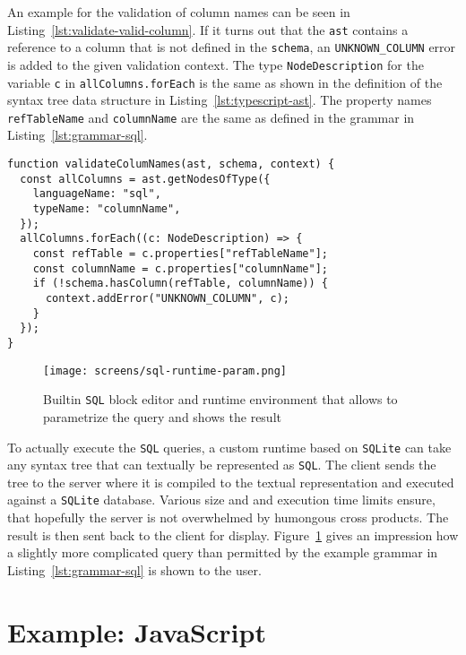 \documentclass[sigconf,natbib=false]{acmart}
\begin{document}
An example for the validation of column names can be seen in Listing~\ref{lst:validate-valid-column}. If it turns out that the \texttt{ast} contains a reference to a column that is not defined in the \texttt{schema}, an \texttt{UNKNOWN\_COLUMN} error is added to the given validation context. The type \texttt{NodeDescription} for the variable \texttt{c} in \texttt{allColumns.forEach} is the same as shown in the definition of the syntax tree data structure in Listing~\ref{lst:typescript-ast}. The property names \texttt{refTableName} and \texttt{columnName} are the same as defined in the grammar in Listing~\ref{lst:grammar-sql}.

\begin{lstlisting}[float,caption={Validating column names against a \texttt{SQL} schema}, label=lst:validate-valid-column]
function validateColumNames(ast, schema, context) {
  const allColumns = ast.getNodesOfType({
    languageName: "sql",
    typeName: "columnName",
  });
  allColumns.forEach((c: NodeDescription) => {
    const refTable = c.properties["refTableName"];
    const columnName = c.properties["columnName"];
    if (!schema.hasColumn(refTable, columnName)) {
      context.addError("UNKNOWN_COLUMN", c);
    }
  });
}
\end{lstlisting}

\begin{figure}
  \texttt{[image: screens/sql-runtime-param.png]}
  \caption{Builtin \texttt{SQL} block editor and runtime environment that allows to parametrize the query and shows the result}
  \label{fig:sql-runtime}
\end{figure}

To actually execute the \texttt{SQL} queries, a custom runtime based on \texttt{SQLite} can take any syntax tree that can textually be represented as \texttt{SQL}. The client sends the tree to the server where it is compiled to the textual representation and executed against a \texttt{SQLite} database. Various size and and execution time limits ensure, that hopefully the server is not overwhelmed by humongous cross products. The result is then sent back to the client for display. Figure~\ref{fig:sql-runtime} gives an impression how a slightly more complicated query than permitted by the example grammar in Listing~\ref{lst:grammar-sql} is shown to the user.

\section{Example: JavaScript}
\end{document}
